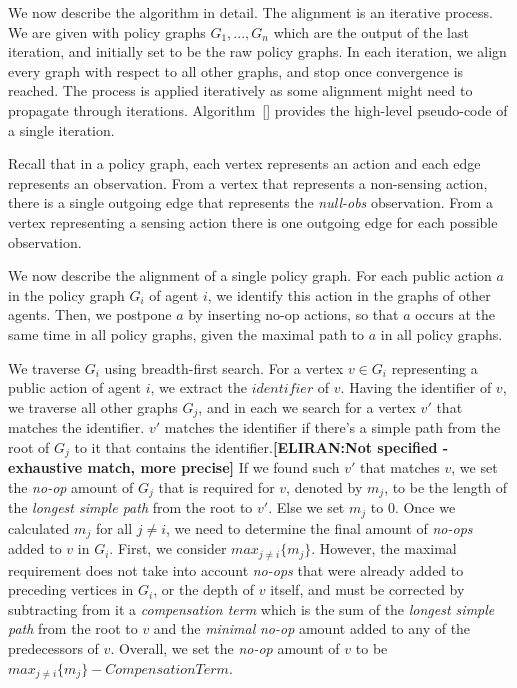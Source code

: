 \documentclass[letterpaper]{article} %
\newcommand{\eliran}[1]{\textbf{[\color{red}ELIRAN:#1]}}
\begin{document}
We now describe the algorithm in detail.
The alignment is an iterative process. We are given with policy graphs $G_1,...,G_n$ which are the output of the last iteration, and initially set to be the raw policy graphs. In each iteration, we align every graph with respect to all other graphs, and stop once convergence is reached. The process is applied iteratively as some alignment might need to propagate through iterations. Algorithm~\ref{} provides the high-level pseudo-code of a single iteration.

Recall that in a policy graph, each vertex represents an action and each edge represents an observation. From a vertex that represents a non-sensing action, there is a single outgoing edge that represents the \emph{null-obs} observation. From a vertex representing a sensing action there is one outgoing edge for each possible observation.

We now describe the alignment of a single policy graph. For each public action $a$ in the policy graph $G_i$ of agent $i$, we identify this action in the graphs of other agents.
Then, we postpone $a$ by inserting no-op actions, so that $a$ occurs at the same time in all policy graphs, given the maximal path to $a$ in all policy graphs.

We traverse $G_i$ using breadth-first search. For a vertex $v\in G_i$ representing a public action of agent $i$, we extract the $identifier$ of $v$. Having the identifier of $v$, we traverse all other graphs $G_j$, and in each we search for a vertex $v'$ that matches the identifier. $v'$ matches the identifier if there's a simple path from the root of $G_j$ to it that contains the identifier.\eliran{Not specified - exhaustive match, more precise}
If we found such $v'$ that matches $v$, we set the {\em no-op} amount of $G_j$ that is required for $v$, denoted by $m_j$, to be the length of the \emph{longest simple path} from the root to $v'$. Else we set $m_j$ to 0.
Once we calculated $m_j$ for all $j\neq i$, we need to determine the final amount of {\em no-ops} added to $v$ in $G_i$. First, we consider $max_{j\neq i}\{m_j\}$. However, the maximal requirement does not take into account {\em no-ops} that were already added to preceding vertices in $G_i$, or the depth of $v$ itself, and must be
corrected by subtracting from it a \emph{compensation term} which is the sum of the \emph{longest simple path} from the root to $v$ and the \emph{minimal} {\em no-op} amount added to any of the predecessors of $v$. Overall, we set the {\em no-op} amount of $v$ to be $max_{j\neq i}\{m_j\} - \mathit{CompensationTerm}$.
\end{document}

